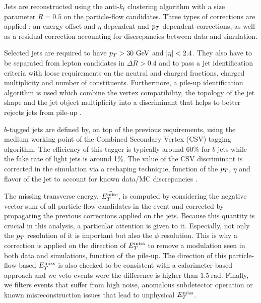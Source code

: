        Jets are reconstructed using the anti-$k_t$ clustering algorithm with a size 
       parameter $R = 0.5$ on the particle-flow candidates. Three types of corrections 
       are applied : an energy offset and $\eta$ dependent and $p_T$ dependent corrections, 
       as well as a residual correction accounting for discrepancies between data and simulation.

       Selected jets are required to have $p_T > 30 ~\text{GeV}$ and $\left| \eta \right| < 2.4$. They also 
       have to be separated from lepton candidates in $\Delta R > 0.4$ and to pass a jet 
       identification criteria with loose requirements on the neutral and 
       charged fractions, charged multiplicity and number of constituents. Furthermore,
       a pile-up identification algorithm is used which combine the vertex compatibility, 
       the topology of the jet shape and the jet object multiplicity into a discriminant 
       that helps to better rejects jets from pile-up .

       $b$-tagged jets are defined by, on top of the previous requirements, using the 
       medium working point of the Combined Secondary Vertex (CSV) tagging algorithm. 
       The efficiency of this tagger is typically around 60\% for $b$-jets while the fake 
       rate of light jets is around 1\%. The value of the CSV discriminant is corrected in 
       the simulation via a reshaping technique, function of the $p_T$, $\eta$ and flavor
       of the jet to account for known data/MC discrepancies .

       The missing transverse energy, $\vec{E_T^\text{miss}}$, is computed by considering the 
       negative vector sum of all particle-flow candidates in the event and corrected by
       propagating the previous corrections applied on the jets. Because this quantity is
       crucial in this analysis, a particular attention is given to it. Especially, not only
       the $p_T$ resolution of it is important but also the $\phi$ resolution. This is why
       a correction is applied on the direction of $E_T^\text{miss}$ to remove a modulation seen in 
       both data and simulations, function of the pile-up. The direction of this 
       particle-flow-based $E_T^\text{miss}$ is also checked to be consistent with a calorimeter-based
       approach and we veto events were the difference is higher than $1.5~\text{rad}$.
       Finally, we filters events that suffer from high noise, anomalous subdetector operation
       or known misreconstruction issues that lead to unphysical $E_T^\text{miss}$.

